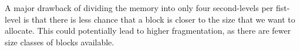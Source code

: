 A major drawback of dividing the memory into only four second-levels per fist-level is that there is less chance that a block is closer to the size that we want to allocate. This could potentially lead to higher fragmentation, as there are fewer size classes of blocks available.


